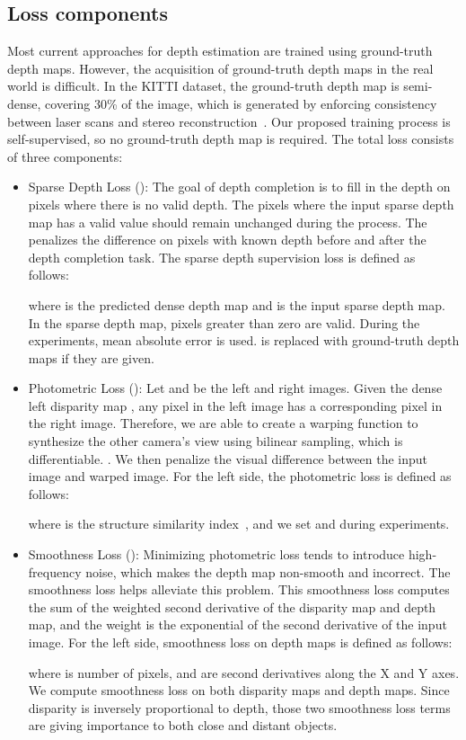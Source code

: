 \documentclass[letterpaper, 10 pt, conference]{ieeeconf}
\begin{document}
\subsection{Loss components}
    Most current approaches for depth estimation are trained using ground-truth depth maps. However, the acquisition of ground-truth depth maps in the real world is difficult. In the KITTI dataset, the ground-truth depth map is semi-dense, covering 30\% of the image, which is generated by enforcing consistency between laser scans and stereo reconstruction~\cite{sparsityCNN}. Our proposed training process is self-supervised, so no ground-truth depth map is required. The total loss consists of three components:
    

    \begin{itemize}
    \item
    Sparse Depth Loss (): The goal of depth completion is to fill in the depth on pixels where there is no valid depth. The pixels where the input sparse depth map has a valid value should remain unchanged during the process. The  penalizes the difference on pixels with known depth before and after the depth completion task. The sparse depth supervision loss is defined as follows:
    
    where  is the predicted dense depth map and  is the input sparse depth map. In the sparse depth map, pixels greater than zero are valid. During the experiments, mean absolute error is used.  is replaced with ground-truth depth maps if they are given.
  
    \item  
    Photometric Loss (): Let  and  be the left and right images. Given the dense left disparity map , any pixel in the left image has a corresponding pixel in the right image. Therefore, we are able to create a warping function  to synthesize the other camera's view using bilinear sampling, which is differentiable. . We then penalize the visual difference between the input image and warped image. For the left side, the photometric loss is defined as follows:
    
    where  is the structure similarity index~\cite{SSIM}, and we set  and  during experiments.

    \item  
    Smoothness Loss (): Minimizing photometric loss tends to introduce high-frequency noise, which makes the depth map non-smooth and incorrect. The smoothness loss helps alleviate this problem. 
    This smoothness loss computes the sum of the weighted second derivative of the disparity map and depth map, and the weight is the exponential of the second derivative of the input image. For the left side, smoothness loss on depth maps is defined as follows:
    
    where  is number of pixels,  and  are second derivatives along the X and Y axes. We compute smoothness loss on both disparity maps and depth maps. Since disparity is inversely proportional to depth, those two smoothness loss terms are giving importance to both close and distant objects.

    \end{itemize}
\end{document}
